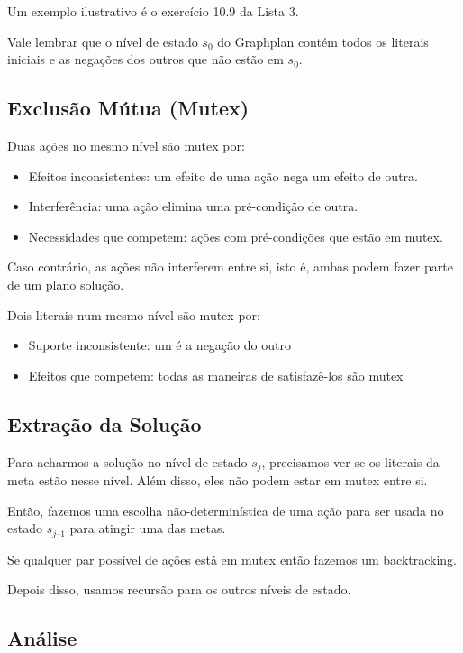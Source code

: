 \documentclass[12pt,letterpaper]{article}
\begin{document}
	Um exemplo ilustrativo é o exercício 10.9 da Lista 3.
	
	Vale lembrar que o nível de estado $s_0$ do Graphplan contém todos os literais iniciais e as negações dos outros que não estão em $s_0$.
	
	\subsection*{Exclusão Mútua (Mutex)}
	
	Duas ações no mesmo nível são mutex por:
	\begin{itemize}
		\item Efeitos inconsistentes: um efeito de uma ação
		nega um efeito de outra.
		\item Interferência: uma ação elimina uma pré-condição de outra.
		\item Necessidades que competem: ações com pré-condições que estão em mutex.
	\end{itemize}
	
	Caso contrário, as ações não interferem entre si,
	isto é, ambas podem fazer parte de um plano
	solução.
	
	Dois literais num mesmo nível são mutex por:
	
	\begin{itemize}
		\item Suporte inconsistente: um é a negação do outro
		\item Efeitos que competem: todas as maneiras de
		satisfazê-los são mutex
	\end{itemize}
	
	\subsection*{Extração da Solução}
	
	Para acharmos a solução no nível de estado $s_j$, precisamos ver se os literais da meta estão nesse nível. Além disso, eles não podem estar em mutex entre si.
	
	Então, fazemos uma escolha não-determinística de uma ação para ser usada no estado $s_{j–1}$ para atingir uma das metas.
	
	Se qualquer par possível de ações está em mutex então fazemos um backtracking.
	
	Depois disso, usamos recursão para os outros níveis de estado.
	
	\subsection*{Análise}
	
\end{document}
